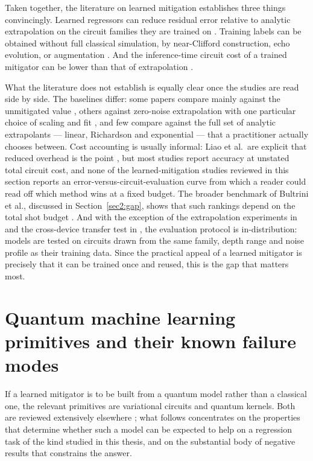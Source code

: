 \documentclass[Thesis.tex]{subfiles}
\begin{document}
Taken together, the literature on learned mitigation establishes three things
convincingly. Learned regressors can reduce residual error relative to
analytic extrapolation on the circuit families they are trained on
\cite{czarnik2021clifford,lowe2021unified,liao2024machine}. Training labels can
be obtained without full classical simulation, by near-Clifford construction,
echo evolution, or augmentation
\cite{czarnik2021clifford,babukhin2024echo,liao2025noiseagnostic}. And the
inference-time circuit cost of a trained mitigator can be lower than that of
extrapolation \cite{liao2024machine}.

What the literature does not establish is equally clear once the studies are
read side by side. The baselines differ: some papers compare mainly against the
unmitigated value \cite{bennewitz2022neural,zhukov2024quantum}, others against
zero-noise extrapolation with one particular choice of scaling and fit
\cite{lowe2021unified,liao2024machine}, and few compare against the full set of
analytic extrapolants --- linear, Richardson and exponential --- that a
practitioner actually chooses between. Cost accounting is usually informal:
Liao et al.\ are explicit that reduced overhead is the point
\cite{liao2024machine}, but most studies report accuracy at unstated total
circuit cost, and none of the learned-mitigation studies reviewed in this
section reports an error-versus-circuit-evaluation curve from which a reader
could read off which method wins at a fixed budget. The broader benchmark of
Bultrini et al., discussed in Section~\ref{sec2:gap}, shows that such rankings
depend on the total shot budget \cite{bultrini2023unifying}. And with the exception of the extrapolation
experiments in \cite{liao2024machine} and the cross-device transfer test in
\cite{zlokapa2020deep}, the evaluation protocol is in-distribution: models are
tested on circuits drawn from the same family, depth range and noise profile as
their training data. Since the practical appeal of a learned mitigator is
precisely that it can be trained once and reused, this is the gap that matters
most.

\section{Quantum machine learning primitives and their known failure modes}\label{sec2:qml}

If a learned mitigator is to be built from a quantum model rather than a
classical one, the relevant primitives are variational circuits and quantum
kernels. Both are reviewed extensively elsewhere \cite{cerezo2021vqa}; what
follows concentrates on the properties that determine whether such a model can
be expected to help on a regression task of the kind studied in this thesis,
and on the substantial body of negative results that constrains the answer.
\end{document}
